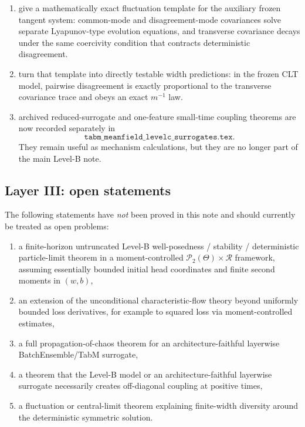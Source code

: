 \documentclass[11pt]{article}
\theoremstyle{definition}
\newcommand{\PP}{\mathcal{P}}
\begin{document}
\begin{enumerate}[leftmargin=2em]
  \item {} give a mathematically exact fluctuation template for the auxiliary frozen tangent system:
  common-mode and disagreement-mode covariances solve separate Lyapunov-type evolution equations, and transverse covariance decays under the same coercivity condition that contracts deterministic disagreement.
  \item {} turn that template into directly testable width predictions:
  in the frozen CLT model, pairwise disagreement is exactly proportional to the transverse covariance trace and obeys an exact $m^{-1}$ law.
  \item archived reduced-surrogate and one-feature small-time coupling theorems are now recorded separately in
  \[
    \texttt{tabm\_meanfield\_levelc\_surrogates.tex}.
  \]
  They remain useful as mechanism calculations, but they are no longer part of the main Level-B note.
\end{enumerate}

\subsection{Layer III: open statements}

The following statements have \emph{not} been proved in this note and should currently be treated as open problems:
\begin{enumerate}[leftmargin=2em]
  \item a finite-horizon untruncated Level-B well-posedness / stability / deterministic particle-limit theorem in a moment-controlled $\PP_2(\Theta)\times \mathcal R$ framework, assuming essentially bounded initial head coordinates and finite second moments in $(w,b)$,
  \item an extension of the unconditional characteristic-flow theory beyond uniformly bounded loss derivatives, for example to squared loss via moment-controlled estimates,
  \item a full propagation-of-chaos theorem for an architecture-faithful layerwise BatchEnsemble/TabM surrogate,
  \item a theorem that the Level-B model or an architecture-faithful layerwise surrogate necessarily creates off-diagonal coupling at positive times,
  \item a fluctuation or central-limit theorem explaining finite-width diversity around the deterministic symmetric solution.
\end{enumerate}
\end{document}
